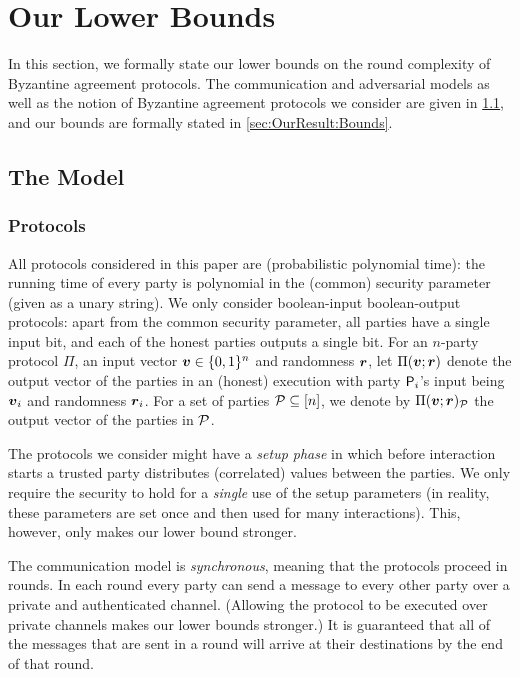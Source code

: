 \section{Our Lower Bounds}\label{sec:OurResult}

In this section, we formally state our lower bounds on the round complexity of Byzantine agreement protocols. The communication and adversarial models as well as the notion of Byzantine agreement protocols we consider are given  in \cref{sec:OurResults:Model}, and our bounds are formally stated in \cref{sec:OurResult:Bounds}.


\subsection{The Model}\label{sec:OurResults:Model}



\subsubsection{Protocols}
All protocols considered in this paper are \ppt (probabilistic polynomial time): the
running time of every party is polynomial in the (common) security parameter (given as a unary string). We only consider boolean-input boolean-output protocols: apart from the common security parameter, all parties have a single input bit, and each of the honest parties outputs a single bit. For an $n$-party protocol $\Pi$, an input vector ${ \boldsymbol{v}}\in {\{0,1\}^n}$ and randomness ${ \boldsymbol{r}}$, let $\Pi({ \boldsymbol{v}}; { \boldsymbol{r}})$ denote the output vector of the parties in an (honest) execution with party $\mathsf{P} _i$'s input being ${ \boldsymbol{v}}_i$ and randomness ${ \boldsymbol{r}}_i$.
For a set of parties $\mathcal{P} \subseteq [n]$, we denote by $\Pi({ \boldsymbol{v}}; { \boldsymbol{r}})_{\mathcal{P}}$
the output vector of the parties in $\mathcal{P}$.

The protocols we consider might have a \emph{setup phase} in which before interaction starts a trusted party distributes (correlated) values between the parties. We only require the security to hold for  a \emph{single} use of the setup parameters  (in reality, these parameters are set once and then used for many interactions). This, however, only makes our lower bound stronger.

The communication model is \emph{synchronous}, meaning that the protocols proceed in rounds. In each round every party can send a message to every other party over a private and authenticated channel. (Allowing the protocol to be executed over private channels makes our lower bounds stronger.) It is guaranteed that all of the messages that are sent in a round will arrive at their destinations by the end of that round.

